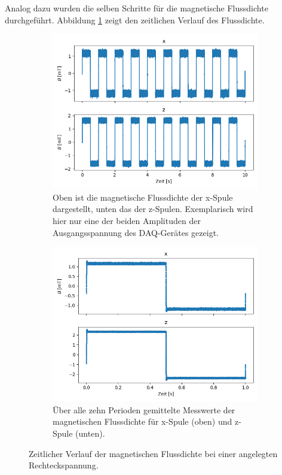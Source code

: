 \documentclass[page,pdftex,12pt,a4paper,twoside,openright]{scrbook}
\begin{document}
Analog dazu wurden die selben Schritte für die magnetische Flussdichte durchgeführt. Abbildung \ref{fig-mag} zeigt den zeitlichen Verlauf des Flussdichte.

\begin{figure}
\centering
\begin{subfigure}[t]{.5\textwidth}
\includegraphics[width=\textwidth]{./img/mag.png}
\caption{Oben ist die magnetische Flussdichte der x-Spule dargestellt, unten das der z-Spulen. Exemplarisch wird hier nur eine der beiden Amplituden der Ausgangsspannung des DAQ-Gerätes gezeigt.}
\label{fig-mag}
\end{subfigure}%
\begin{subfigure}[t]{.5\textwidth}
\includegraphics[width=\textwidth]{./img/mag_avg.png}
\caption{Über alle zehn Perioden gemittelte Messwerte der magnetischen Flussdichte für x-Spule (oben) und z-Spule (unten).}
\label{fig-mag_avg}
\end{subfigure}
\caption{Zeitlicher Verlauf der magnetischen Flussdichte bei einer angelegten Rechteckspannung.}
\end{figure}
\end{document}
